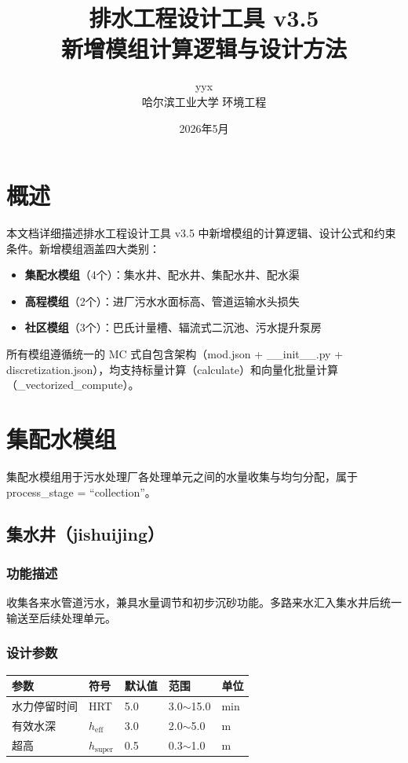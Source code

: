 \documentclass[12pt,a4paper]{ctexart}
\title{\textbf{排水工程设计工具 v3.5}\\[6pt]
       \large 新增模组计算逻辑与设计方法}
\author{yyx \\ 哈尔滨工业大学 环境工程}
\date{2026年5月}
\begin{document}
\maketitle
\tableofcontents
\newpage

\section{概述}

本文档详细描述排水工程设计工具 v3.5 中新增模组的计算逻辑、设计公式和约束条件。新增模组涵盖四大类别：

\begin{itemize}[itemsep=0pt]
    \item \textbf{集配水模组}（4个）：集水井、配水井、集配水井、配水渠
    \item \textbf{高程模组}（2个）：进厂污水水面标高、管道运输水头损失
    \item \textbf{社区模组}（3个）：巴氏计量槽、辐流式二沉池、污水提升泵房
\end{itemize}

所有模组遵循统一的 MC 式自包含架构（mod.json + \_\_init\_\_.py + discretization.json），均支持标量计算（calculate）和向量化批量计算（\_vectorized\_compute）。

\section{集配水模组}

集配水模组用于污水处理厂各处理单元之间的水量收集与均匀分配，属于 process\_stage = ``collection''。

\subsection{集水井（jishuijing）}

\subsubsection{功能描述}
收集各来水管道污水，兼具水量调节和初步沉砂功能。多路来水汇入集水井后统一输送至后续处理单元。

\subsubsection{设计参数}
\begin{table}[h]
\centering
\begin{tabular}{@{}lllll@{}}
\toprule
参数 & 符号 & 默认值 & 范围 & 单位 \\
\midrule
水力停留时间 & HRT & 5.0 & 3.0$\sim$15.0 & min \\
有效水深     & $h_{\text{eff}}$ & 3.0 & 2.0$\sim$5.0 & m \\
超高         & $h_{\text{super}}$ & 0.5 & 0.3$\sim$1.0 & m \\
\bottomrule
\end{tabular}
\end{table}
\end{document}
